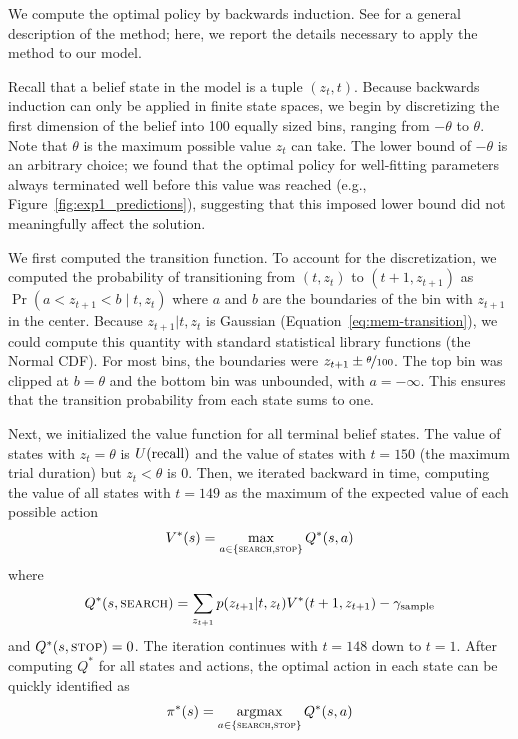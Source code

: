 We compute the optimal policy by backwards induction. See \citet{puterman2014markov} for a general description of the method; here, we report the details necessary to apply the method to our model.

Recall that a belief state in the model is a tuple $(z_t, t)$. Because backwards induction can only be applied in finite state spaces, we begin by discretizing the first dimension of the belief into 100 equally sized bins, ranging from $-\theta$ to $\theta$. Note that $\theta$ is the maximum possible value $z_t$ can take. The lower bound of $-\theta$ is an arbitrary choice; we found that the optimal policy for well-fitting parameters always terminated well before this value was reached (e.g., Figure~\ref{fig:exp1_predictions}), suggesting that this imposed lower bound did not meaningfully affect the solution.

We first computed the transition function. To account for the discretization, we computed the probability of transitioning from $(t, z_t)$ to $(t+1, z_{t+1})$ as $\Pr(a < z_{t+1} < b \mid t, z_t)$ where $a$ and $b$ are the boundaries of the bin with $z_{t+1}$ in the center. Because $z_{t+1}|t,z_t$ is Gaussian (Equation~\ref{eq:mem-transition}), we could compute this quantity with standard statistical library functions (the Normal CDF). For most bins, the boundaries were $z_{t+1} \pm \nicefrac{\theta}{100}$. The top bin was clipped at $b = \theta$ and the bottom bin was unbounded, with $a = -\infty$. This ensures that the transition probability from each state sums to one.

Next, we initialized the value function for all terminal belief states. The value of states with $z_t = \theta$ is $U({\text{recall}})$ and the value of states with $t=150$ (the maximum trial duration) but $z_t < \theta$ is 0. Then, we iterated backward in time, computing the value of all states with $t=149$ as the maximum of the expected value of each possible action
%
\begin{equation}
\begin{aligned}
  V^*(s) = \max_{a \in \{\textsc{search}, \textsc{stop}\}} Q^*(s, a) 
\end{aligned}
\end{equation}
where
%
\begin{equation}
  Q^*(s, \textsc{search}) = \sum_{z_{t+1}} p(z_{t+1} | t, z_t) V^*(t+1, z_{t+1}) - \gamma_\text{sample}
\end{equation}
%
and $Q^*(s, \textsc{stop}) = 0$. The iteration continues with $t=148$ down to $t=1$. After computing $Q^*$ for all states and actions, the optimal action in each state can be quickly identified as
%
\begin{equation}
  \pi^*(s) = \operatorname*{argmax}_{a \in \{\textsc{search}, \textsc{stop}\}} Q^*(s, a) 
\end{equation}
%

